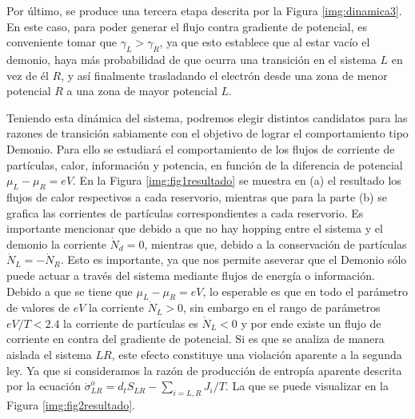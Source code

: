 
Por último, se produce una tercera etapa descrita por la Figura \ref{img:dinamica3}. En este caso, para poder generar el flujo contra gradiente de potencial, es conveniente tomar que $\gamma_{L}>\gamma_{R}$, ya que esto establece que al estar vacío el demonio, haya más probabilidad de que ocurra una transición en el sistema $L$ en vez de él $R$, y así finalmente trasladando el electrón desde una zona de menor potencial $R$ a una zona de mayor potencial $L$.


Teniendo esta dinámica del sistema, podremos elegir distintos candidatos para las razones de transición sabiamente con el objetivo de lograr el comportamiento tipo Demonio. Para ello se estudiará el comportamiento de los flujos de corriente de partículas, calor, información y potencia, en función de la diferencia de potencial $\mu_{L}-\mu_{R}=eV$. En la Figura \ref{img:fig1resultado} se muestra en (a) el resultado los flujos de calor respectivos a cada reservorio, mientras que para la parte (b) se grafica las corrientes de partículas correspondientes a cada reservorio. Es importante mencionar que debido a que no hay hopping entre el sistema y el demonio la corriente $\dot{N}_{d}=0$, mientras que, debido a la conservación de partículas $\dot{N}_{L}=-\dot{N}_{R}$. Esto es importante, ya que nos permite aseverar que el Demonio sólo puede actuar a través del sistema mediante flujos de energía o información. Debido a que se tiene que $\mu_{L}-\mu_{R} = eV$, lo esperable es que en todo el parámetro de valores de $eV$ la corriente $\dot{N}_{L}>0$, sin embargo en el rango de parámetros $eV/T<2.4$ la corriente de partículas es $\dot{N}_{L}<0$ y por ende existe un flujo de corriente en contra del gradiente de potencial. Si es que se analiza de manera aislada el sistema $LR$, este efecto constituye una violación aparente a la segunda ley. Ya que si consideramos la razón de producción de entropía aparente descrita por la ecuación $\dot{\sigma}^{o}_{LR}= d_{t}S_{LR} - \sum_{i=L,R}J_{i}/T$. La que se puede visualizar en la Figura \ref{img:fig2resultado}.


